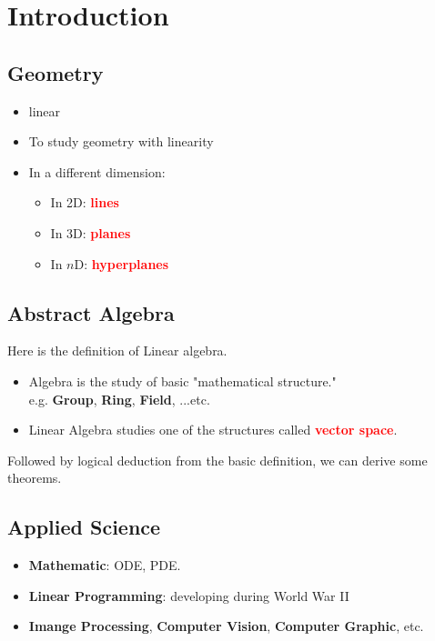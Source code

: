 \chapter{Introduction}
\section{Geometry}
\begin{itemize}
    \item linear
    \item To study geometry with linearity
    \item In a different dimension:
    \begin{itemize}
        \item In 2D: \textcolor{red}{\textbf{lines}}
        \item In 3D: \textcolor{red}{\textbf{planes}}
        \item In $n$D: \textcolor{red}{\textbf{hyperplanes}}

    \end{itemize}
\end{itemize}

\section{Abstract Algebra}

\begin{definition}
    Here is the definition of Linear algebra.
    \begin{itemize}
        \item Algebra is the study of basic "mathematical structure." \\
        e.g. \textbf{Group}, \textbf{Ring}, \textbf{Field}, ...etc.
        \item Linear Algebra studies one of the structures called \textcolor{red}{\textbf{vector space}}.
    \end{itemize}
\end{definition}

\begin{note}
Followed by logical deduction from the basic definition, we can derive some theorems.
\end{note}

\section{Applied Science}
\begin{itemize}
    \item \textbf{Mathematic}: ODE, PDE.
    \item \textbf{Linear Programming}: developing during World War II
    \item \textbf{Imange Processing}, \textbf{Computer Vision}, \textbf{Computer Graphic}, etc.
\end{itemize}

